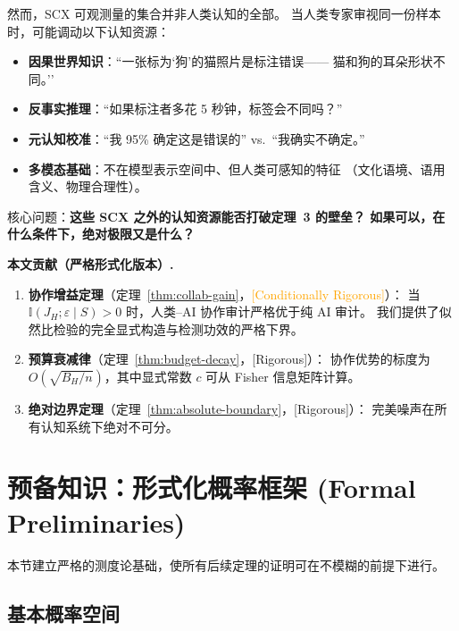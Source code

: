 \documentclass[12pt,a4paper]{article}
\newcommand{\rigorous}{\textcolor{green!50!black}{\small\textsf{[Rigorous]}}}
\newcommand{\conditionallyrigorous}{\textcolor{orange}{\small\textsf{[Conditionally Rigorous]}}}
\newcommand{\I}{\mathbb{I}}
\begin{document}
然而，SCX 可观测量的集合并非人类认知的全部。
当人类专家审视同一份样本时，可能调动以下认知资源：
\begin{itemize}
    \item \textbf{因果世界知识}：``一张标为`狗'的猫照片是标注错误——
          猫和狗的耳朵形状不同。''
    \item \textbf{反事实推理}：``如果标注者多花 5 秒钟，标签会不同吗？''
    \item \textbf{元认知校准}：``我 95\% 确定这是错误的'' vs.\ ``我确实不确定。''
    \item \textbf{多模态基础}：不在模型表示空间中、但人类可感知的特征
          （文化语境、语用含义、物理合理性）。
\end{itemize}

核心问题：\textbf{这些 SCX 之外的认知资源能否打破定理~3 的壁垒？
如果可以，在什么条件下，绝对极限又是什么？}

\medskip\noindent
\textbf{本文贡献（严格形式化版本）.}
\begin{enumerate}[label=(\arabic*)]
    \item \textbf{协作增益定理}（定理~\ref{thm:collab-gain}，\conditionallyrigorous）：
          当 $\I(J_H; \varepsilon \mid S) > 0$ 时，人类--AI 协作审计严格优于纯 AI 审计。
          我们提供了似然比检验的完全显式构造与检测功效的严格下界。
    \item \textbf{预算衰减律}（定理~\ref{thm:budget-decay}，\rigorous）：
          协作优势的标度为 $O(\sqrt{B_H/n})$，其中显式常数 $c$ 可从 Fisher 信息矩阵计算。
    \item \textbf{绝对边界定理}（定理~\ref{thm:absolute-boundary}，\rigorous）：
          完美噪声在所有认知系统下绝对不可分。
\end{enumerate}

\section{预备知识：形式化概率框架 (Formal Preliminaries)}

本节建立严格的测度论基础，使所有后续定理的证明可在不模糊的前提下进行。

\subsection{基本概率空间}
\end{document}
